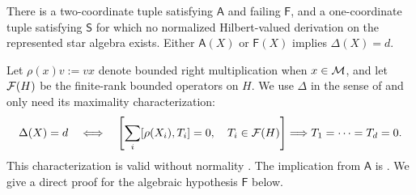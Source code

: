 \begin{theorem}\label{thm:general}
There is a two-coordinate tuple satisfying $\mathsf A$ and failing $\mathsf F$, and a one-coordinate tuple satisfying $\mathsf S$ for which no normalized Hilbert-valued derivation on the represented star algebra exists.
Either $\mathsf A(X)$ or $\mathsf F(X)$ implies $\Delta(X)=d$.
\end{theorem}

Let $\rho(x)v:=vx$ denote bounded right multiplication when $x\in\mathcal M$, and let $\mathcal F(H)$ be the finite-rank bounded operators on $H$.
We use $\Delta$ in the sense of \cite{MSY23} and only need its maximality characterization:
\begin{equation}\label{eq:cycles}
 \Delta(X)=d\quad\Longleftrightarrow\quad
 \left[\sum_i[\rho(X_i),T_i]=0,\quad T_i\in\mathcal F(H)\right]
 \Longrightarrow T_1=\cdots=T_d=0.
\end{equation}
This characterization is valid without normality \cite[Theorem~3.1]{MSY23}.
The implication from $\mathsf A$ is \cite[Proposition~3.5]{ACSY24}.
We give a direct proof for the algebraic hypothesis $\mathsf F$ below.

